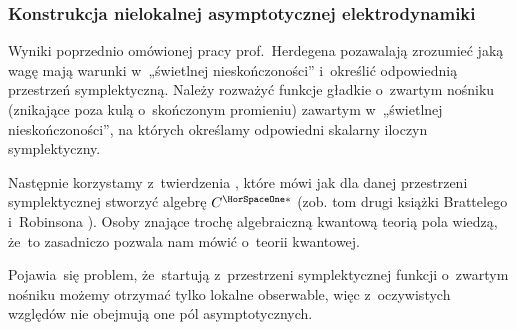 \documentclass[10pt,t]{beamer}
\begin{document}
\begin{frame}
  \frametitle{Konstrukcja nielokalnej asymptotycznej
    elektrodynamiki}


  Wyniki poprzednio omówionej pracy prof.~Herdegena pozawalają zrozumieć
  jaką wagę mają warunki w~„świetlnej nieskończoności” i~określić
  odpowiednią przestrzeń symplektyczną. Należy rozważyć funkcje gładkie
  o~zwartym nośniku (znikające poza kulą o~skończonym promieniu) zawartym
  w~„świetlnej nieskończoności”, na których określamy odpowiedni skalarny
  iloczyn symplektyczny.

  Następnie korzystamy z~twierdzenia
  ,
  które mówi jak dla danej przestrzeni symplektycznej stworzyć algebrę
  $C^{ \HorSpaceOne * }$
  (zob. tom drugi książki Brattelego i~Robinsona
  \parencite{Bratteli-Robinson-Operator-algebras-ETC-Vol-I-Pub-2002}).
  Osoby znające trochę algebraiczną kwantową teorią pola wiedzą, że~to
  zasadniczo pozwala nam mówić o~teorii kwantowej.

  Pojawia~się problem, że~startują z~przestrzeni symplektycznej funkcji
  o~zwartym nośniku możemy otrzymać tylko \alert{lokalne} obserwable,
  więc z~oczywistych względów nie obejmują one pól asymptotycznych.

\end{frame}








\end{document}
